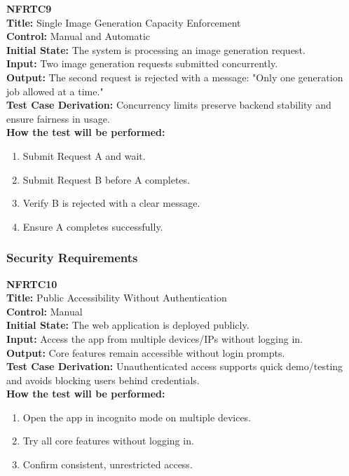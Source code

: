 \documentclass[12pt, titlepage]{article}
\begin{document}
\vspace{1em}

\textbf{NFRTC9}\\
\textbf{Title:} Single Image Generation Capacity Enforcement\\
\textbf{Control:} Manual and Automatic\\
\textbf{Initial State:} The system is processing an image generation request.\\
\textbf{Input:} Two image generation requests submitted concurrently.\\
\textbf{Output:} The second request is rejected with a message: "Only one generation job allowed at a time."\\
\textbf{Test Case Derivation:} Concurrency limits preserve backend stability and ensure fairness in usage.\\
\textbf{How the test will be performed:}
\begin{enumerate}
  \item Submit Request A and wait.
  \item Submit Request B before A completes.
  \item Verify B is rejected with a clear message.
  \item Ensure A completes successfully.
\end{enumerate}

\vspace{1em}
\subsubsection{Security Requirements}

\textbf{NFRTC10}\\
\textbf{Title:} Public Accessibility Without Authentication\\
\textbf{Control:} Manual\\
\textbf{Initial State:} The web application is deployed publicly.\\
\textbf{Input:} Access the app from multiple devices/IPs without logging in.\\
\textbf{Output:} Core features remain accessible without login prompts.\\
\textbf{Test Case Derivation:} Unauthenticated access supports quick demo/testing and avoids blocking users behind credentials.\\
\textbf{How the test will be performed:}
\begin{enumerate}
  \item Open the app in incognito mode on multiple devices.
  \item Try all core features without logging in.
  \item Confirm consistent, unrestricted access.
\end{enumerate}
\end{document}
